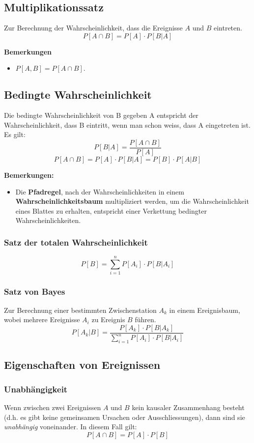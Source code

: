 \documentclass[10pt,a4paper,twocolumn]{article}
\begin{document}
\subsection{Multiplikationssatz}
Zur Berechnung der Wahrscheinlichkeit, dass die Ereignisse $A$ und $B$ eintreten.
\[
P[A \cap B] = P[A] \cdot P[B|A]
\]

\textbf{Bemerkungen}
\begin{itemize}
\item $P[A,B]=P[A \cap B]$.
\end{itemize}

\subsection{Bedingte Wahrscheinlichkeit}
Die bedingte Wahrscheinlichkeit von B gegeben A entspricht der Wahrscheinlichkeit, dass B eintritt, wenn man schon weiss, dass A eingetreten ist. Es gilt:
\[
P[B|A]=\frac{P[A\cap B]}{P[A]}
\]
\[
P[A\cap B]=P[A]\cdot P[B|A]=P[B]\cdot P[A|B]
\]

\textbf{Bemerkungen:}
\begin{itemize}
\item Die \textbf{Pfadregel}, nach der Wahrscheinlichkeiten in einem \textbf{Wahrscheinlichkeitsbaum} multipliziert werden, um die Wahrscheinlichkeit eines Blattes zu erhalten, entspricht einer Verkettung bedingter Wahrscheinlichkeiten.
\end{itemize}

\subsubsection{Satz der totalen Wahrscheinlichkeit}
\[
P[B] = \sum \limits_{i=1}^{n} P[A_i] \cdot P[B|A_i]
\]

\subsubsection{Satz von Bayes}
Zur Berechnung einer bestimmten Zwischenstation $A_k$ in einem Ereignisbaum, wobei mehrere Ereignisse $A_i$ zu Ereignis $B$ führen.
\[
P[A_k|B] = \frac{P[A_k] \cdot P[B|A_k]}{\sum \limits_{i=1}^{n} P[A_i] \cdot P[B|A_i]}
\]

\subsection{Eigenschaften von Ereignissen}

\subsubsection{Unabhängigkeit}
Wenn zwischen zwei Ereignissen $A$ und $B$ kein kausaler Zusammenhang besteht (d.h. es gibt keine gemeinsamen Ursachen oder Ausschliessungen), dann sind sie \emph{unabhängig} voneinander. In diesem Fall gilt:
\[
P[A \cap B] = P[A] \cdot P[B]
\]
\end{document}
